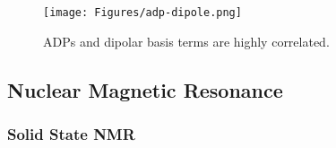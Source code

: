 \begin{refsection}
\begin{figure}
    \centering
    \texttt{[image: Figures/adp-dipole.png]}
    \caption{ADPs and dipolar basis terms are highly correlated.}
    \label{fig:adp-dipole}
\end{figure}

\subsection{Nuclear Magnetic Resonance}

\subsubsection{Solid State NMR}

\printbibliography[heading=subbibliography]
\end{refsection}

